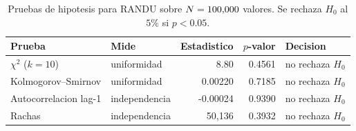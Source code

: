 \begin{table}[htbp]\centering
\caption{Pruebas de hipotesis para RANDU sobre $N=100{,}000$ valores. Se rechaza $H_0$ al $5\%$ si $p<0.05$.}
\label{tab:pruebasRANDU}
\small
\begin{tabular}{l|l|r|r|l}
\toprule
Prueba & Mide & Estadistico & $p$-valor & Decision \\
\midrule
$\chi^2$ ($k=10$) & uniformidad & 8.80 & 0.4561 & no rechaza $H_0$ \\
Kolmogorov--Smirnov & uniformidad & 0.00220 & 0.7185 & no rechaza $H_0$ \\
Autocorrelacion lag-1 & independencia & -0.00024 & 0.9390 & no rechaza $H_0$ \\
Rachas & independencia & 50{,}136 & 0.3932 & no rechaza $H_0$ \\
\bottomrule
\end{tabular}
\end{table}
